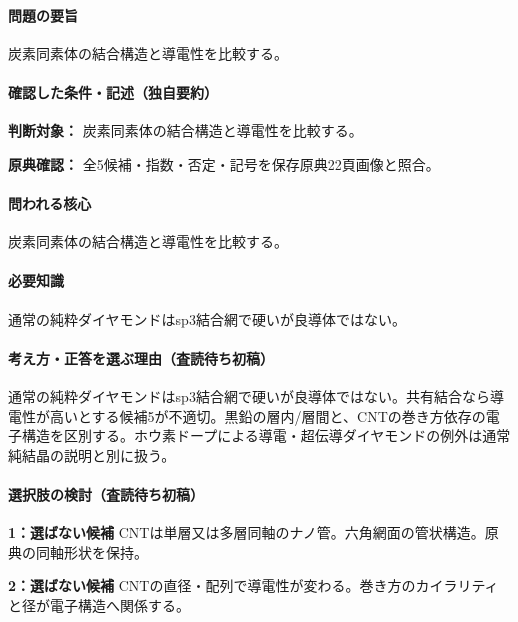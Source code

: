\paragraph{問題の要旨} 炭素同素体の結合構造と導電性を比較する。

\paragraph{確認した条件・記述（独自要約）}\mbox{}\par

\noindent\textbf{判断対象：} 炭素同素体の結合構造と導電性を比較する。\par

\noindent\textbf{原典確認：} 全5候補・指数・否定・記号を保存原典22頁画像と照合。\par

\paragraph{問われる核心} 炭素同素体の結合構造と導電性を比較する。

\paragraph{必要知識} 通常の純粋ダイヤモンドはsp3結合網で硬いが良導体ではない。

\paragraph{考え方・正答を選ぶ理由（査読待ち初稿）} 通常の純粋ダイヤモンドはsp3結合網で硬いが良導体ではない。共有結合なら導電性が高いとする候補5が不適切。黒鉛の層内/層間と、CNTの巻き方依存の電子構造を区別する。ホウ素ドープによる導電・超伝導ダイヤモンドの例外は通常純結晶の説明と別に扱う。

\paragraph{選択肢の検討（査読待ち初稿）}\mbox{}\par

\noindent\textbf{1：選ばない候補} CNTは単層又は多層同軸のナノ管。六角網面の管状構造。原典の同軸形状を保持。\par

\noindent\textbf{2：選ばない候補} CNTの直径・配列で導電性が変わる。巻き方のカイラリティと径が電子構造へ関係する。\par

